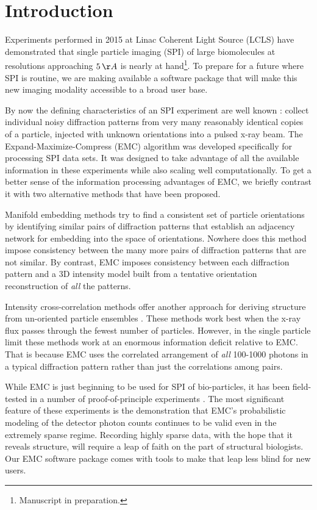 \documentclass[]{iucr}              %
\begin{document}
\section{Introduction}

Experiments performed in 2015 at Linac Coherent Light Source (LCLS) \cite{Aquila2015} have demonstrated that single particle imaging (SPI) of large biomolecules at resolutions approaching $5 \,\AA$ is nearly at hand\footnote{Manuscript in preparation.}. To prepare for a future where SPI is routine, we are making available a software package that will make this new imaging modality accessible to a broad user base.

By now the defining characteristics of an SPI experiment are well known \cite{Neutze2000}: collect individual noisy diffraction patterns from very many reasonably identical copies of a particle, injected with unknown orientations into a pulsed x-ray beam. The Expand-Maximize-Compress (EMC) algorithm \cite{loh2009} was developed specifically for processing SPI data sets. It was designed to take advantage of all the available information in these experiments while also scaling well computationally. To get a better sense of the information processing advantages of EMC, we briefly contrast it with two alternative methods that have been proposed.

Manifold embedding methods \cite{Schwander2012} try to find a consistent set of particle orientations by identifying similar pairs of diffraction patterns that establish an adjacency network for embedding into the space of orientations. Nowhere does this method impose consistency between the many more pairs of diffraction patterns that are not similar. By contrast, EMC imposes consistency between each diffraction pattern and a 3D intensity model built from a tentative orientation reconstruction of \textit{all} the patterns.

Intensity cross-correlation methods offer another approach for deriving structure from un-oriented particle ensembles \cite{Kam1977, Saldin2010}. These methods work best when the x-ray flux passes through the fewest number of particles. However, in the single particle limit these methods work at an enormous information deficit relative to EMC. That is because EMC uses the correlated arrangement of \textit{all} 100-1000 photons in a typical diffraction pattern rather than just the correlations among pairs.

While EMC is just beginning to be used for SPI of bio-particles, it has been field-tested in a number of proof-of-principle experiments \cite{philipp2012,ayyer2014,wierman2016}. The most significant feature of these experiments is the demonstration that EMC's probabilistic modeling of the detector photon counts continues to be valid even in the extremely sparse regime. Recording highly sparse data, with the hope that it reveals structure, will require a leap of faith on the part of structural biologists. Our EMC software package comes with tools to make that leap less blind for new users.
\end{document}
